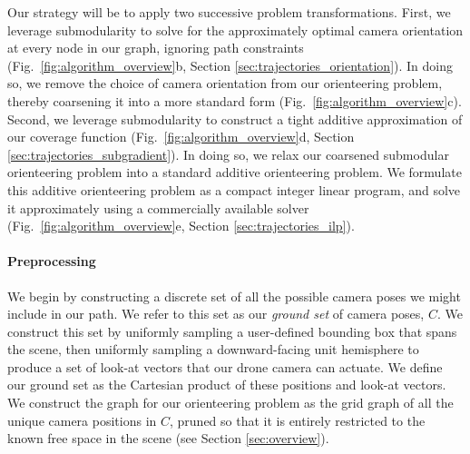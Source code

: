 Our strategy will be to apply two successive problem transformations.
First, we leverage submodularity to solve for the approximately optimal camera orientation at every node in our graph, ignoring path constraints (Fig.~\ref{fig:algorithm_overview}b, Section \ref{sec:trajectories_orientation}).
In doing so, we remove the choice of camera orientation from our orienteering problem, thereby coarsening it into a more standard form (Fig.~\ref{fig:algorithm_overview}c).
Second, we leverage submodularity to construct a tight additive approximation of our coverage function (Fig.~\ref{fig:algorithm_overview}d, Section \ref{sec:trajectories_subgradient}).
In doing so, we relax our coarsened submodular orienteering problem into a standard additive orienteering problem.
We formulate this additive orienteering problem as a compact integer linear program, and solve it approximately using a commercially available solver (Fig.~\ref{fig:algorithm_overview}e, Section \ref{sec:trajectories_ilp}).

\vspace{-10pt}
\paragraph{Preprocessing}
We begin by constructing a discrete set of all the possible camera poses we might include in our path.
We refer to this set as our \emph{ground set} of camera poses, $C$.
We construct this set by uniformly sampling a user-defined bounding box that spans the scene, then uniformly sampling a downward-facing unit hemisphere to produce a set of look-at vectors that our drone camera can actuate. We define our ground set as the Cartesian product of these positions and look-at vectors.
We construct the graph for our orienteering problem as the grid graph of all the unique camera positions in $C$, pruned so that it is entirely restricted to the known free space in the scene  (see Section \ref{sec:overview}).

\vspace{-10pt}
